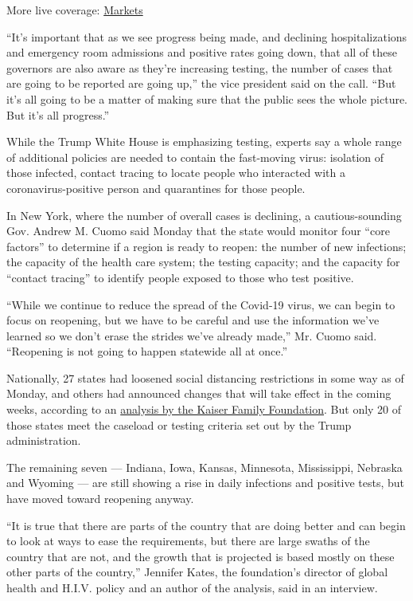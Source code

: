 More live coverage:
\href{https://www.nytimes.com/live/2020/08/04/business/stock-market-today-coronavirus?action=click\&pgtype=Article\&state=default\&region=MAIN_CONTENT_1\&context=storylines_live_updates}{Markets}

``It's important that as we see progress being made, and declining
hospitalizations and emergency room admissions and positive rates going
down, that all of these governors are also aware as they're increasing
testing, the number of cases that are going to be reported are going
up,'' the vice president said on the call. ``But it's all going to be a
matter of making sure that the public sees the whole picture. But it's
all progress.''

While the Trump White House is emphasizing testing, experts say a whole
range of additional policies are needed to contain the fast-moving
virus: isolation of those infected, contact tracing to locate people who
interacted with a coronavirus-positive person and quarantines for those
people.

In New York, where the number of overall cases is declining, a
cautious-sounding Gov. Andrew M. Cuomo said Monday that the state would
monitor four ``core factors'' to determine if a region is ready to
reopen: the number of new infections; the capacity of the health care
system; the testing capacity; and the capacity for ``contact tracing''
to identify people exposed to those who test positive.

``While we continue to reduce the spread of the Covid-19 virus, we can
begin to focus on reopening, but we have to be careful and use the
information we've learned so we don't erase the strides we've already
made,'' Mr. Cuomo said. ``Reopening is not going to happen statewide all
at once.''

Nationally, 27 states had loosened social distancing restrictions in
some way as of Monday, and others had announced changes that will take
effect in the coming weeks, according to an
\href{https://www.kff.org/coronavirus-policy-watch/lifting-social-distancing-measures-in-america-state-actions-metrics/}{analysis
by the Kaiser Family Foundation}. But only 20 of those states meet the
caseload or testing criteria set out by the Trump administration.

The remaining seven --- Indiana, Iowa, Kansas, Minnesota, Mississippi,
Nebraska and Wyoming --- are still showing a rise in daily infections
and positive tests, but have moved toward reopening anyway.

``It is true that there are parts of the country that are doing better
and can begin to look at ways to ease the requirements, but there are
large swaths of the country that are not, and the growth that is
projected is based mostly on these other parts of the country,''
Jennifer Kates, the foundation's director of global health and H.I.V.
policy and an author of the analysis, said in an interview.

